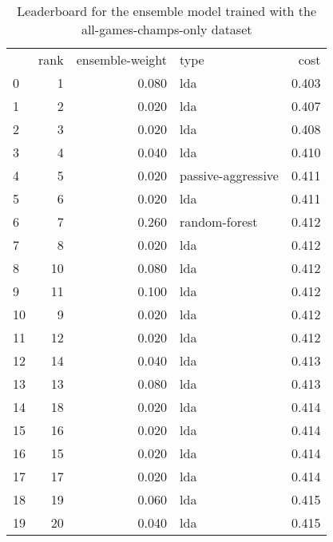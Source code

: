 
\begin{table}[]
	\centering
	\begin{tabular}{lrrlr}
		   & rank & ensemble-weight & type               & cost  \\
		0  & 1    & 0.080           & lda                & 0.403 \\
		1  & 2    & 0.020           & lda                & 0.407 \\
		2  & 3    & 0.020           & lda                & 0.408 \\
		3  & 4    & 0.040           & lda                & 0.410 \\
		4  & 5    & 0.020           & passive-aggressive & 0.411 \\
		5  & 6    & 0.020           & lda                & 0.411 \\
		6  & 7    & 0.260           & random-forest      & 0.412 \\
		7  & 8    & 0.020           & lda                & 0.412 \\
		8  & 10   & 0.080           & lda                & 0.412 \\
		9  & 11   & 0.100           & lda                & 0.412 \\
		10 & 9    & 0.020           & lda                & 0.412 \\
		11 & 12   & 0.020           & lda                & 0.412 \\
		12 & 14   & 0.040           & lda                & 0.413 \\
		13 & 13   & 0.080           & lda                & 0.413 \\
		14 & 18   & 0.020           & lda                & 0.414 \\
		15 & 16   & 0.020           & lda                & 0.414 \\
		16 & 15   & 0.020           & lda                & 0.414 \\
		17 & 17   & 0.020           & lda                & 0.414 \\
		18 & 19   & 0.060           & lda                & 0.415 \\
		19 & 20   & 0.040           & lda                & 0.415 \\
	\end{tabular}

	\caption{Leaderboard for the ensemble model trained with the all-games-champs-only dataset}
	\label{tab:lb-all-games-champs-only}
\end{table}

